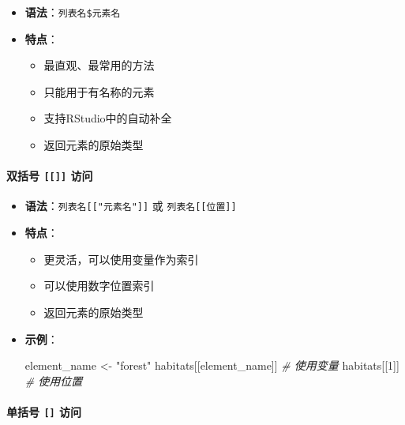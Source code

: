 \documentclass[
  twoside]{book}
\newenvironment{Shaded}{\begin{snugshade}}{\end{snugshade}}
\newcommand{\CommentTok}[1]{\textcolor[rgb]{0.56,0.35,0.01}{\textit{#1}}}
\newcommand{\DecValTok}[1]{\textcolor[rgb]{0.00,0.00,0.81}{#1}}
\newcommand{\NormalTok}[1]{#1}
\newcommand{\OtherTok}[1]{\textcolor[rgb]{0.56,0.35,0.01}{#1}}
\newcommand{\StringTok}[1]{\textcolor[rgb]{0.31,0.60,0.02}{#1}}
\providecommand{\tightlist}{%
  \setlength{\itemsep}{0pt}\setlength{\parskip}{0pt}}
\begin{document}
\begin{itemize}
\tightlist
\item
  \textbf{语法}：\texttt{列表名\$元素名}
\item
  \textbf{特点}：

  \begin{itemize}
  \tightlist
  \item
    最直观、最常用的方法
  \item
    只能用于有名称的元素
  \item
    支持RStudio中的自动补全
  \item
    返回元素的原始类型
  \end{itemize}
\end{itemize}

\hypertarget{ux53ccux62ecux53f7-ux8bbfux95ee}{%
\paragraph{\texorpdfstring{双括号 \texttt{{[}{[}{]}{]}} 访问}{双括号 {[}{[}{]}{]} 访问}}\label{ux53ccux62ecux53f7-ux8bbfux95ee}}

\begin{itemize}
\item
  \textbf{语法}：\texttt{列表名{[}{[}"元素名"{]}{]}} 或 \texttt{列表名{[}{[}位置{]}{]}}
\item
  \textbf{特点}：

  \begin{itemize}
  \tightlist
  \item
    更灵活，可以使用变量作为索引
  \item
    可以使用数字位置索引
  \item
    返回元素的原始类型
  \end{itemize}
\item
  \textbf{示例}：

\begin{Shaded}
\begin{Highlighting}[]
\NormalTok{element\_name }\OtherTok{\textless{}{-}} \StringTok{"forest"}
\NormalTok{habitats[[element\_name]]  }\CommentTok{\# 使用变量}
\NormalTok{habitats[[}\DecValTok{1}\NormalTok{]]             }\CommentTok{\# 使用位置}
\end{Highlighting}
\end{Shaded}
\end{itemize}

\hypertarget{ux5355ux62ecux53f7-ux8bbfux95ee}{%
\paragraph{\texorpdfstring{单括号 \texttt{{[}{]}} 访问}{单括号 {[}{]} 访问}}\label{ux5355ux62ecux53f7-ux8bbfux95ee}}
\end{document}
